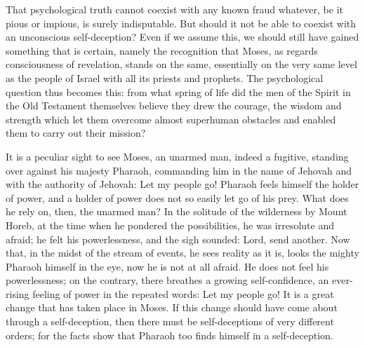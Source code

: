 \documentclass[12pt,a4paper,openany]{book}
\newcommand{\opage}[1]{\marginnote{\footnotesize\textit{[#1]}}}
\begin{document}
\setcounter{footnote}{0}%
\opage{25}That psychological truth cannot coexist
with any known fraud whatever, be it pious
or impious, is surely indisputable. But should it
not be able to coexist with an unconscious self-deception? Even
if we assume this, we should still have gained something that
is certain, namely the recognition that Moses, as regards consciousness of revelation,
stands on the same, essentially
on the very same level as the people of Israel with all its
priests and prophets. The psychological question
thus becomes this: from what spring of life did the men of the Spirit
in the Old Testament themselves believe they drew the
courage, the wisdom and strength which let them overcome
almost superhuman obstacles and enabled them
to carry out their mission?

It is a peculiar sight to see Moses, an unarmed
man, indeed a fugitive, standing over against his majesty
Pharaoh, commanding him in the name of Jehovah and with
the authority of Jehovah: Let my people go! Pharaoh feels
himself the holder of power, and a holder of power does not so
easily let go of his prey. What does he rely on, then, the unarmed
man? In the solitude of the wilderness by Mount Horeb, at the
time when he pondered the possibilities, he was irresolute
and afraid; he felt his powerlessness, and the sigh sounded:
Lord, send another. Now that, in the midst of the stream of events,
he sees reality as it is, looks the
mighty Pharaoh himself in the eye, now he is not at all
afraid. He does not feel his powerlessness; on the contrary, there breathes
a growing self-confidence, an ever-rising feeling of
power in the repeated words: Let my people go! It is
a great change that has taken place in Moses. If
this change should have come about through a self-deception, then
there must be self-deceptions of very different orders;
\setcounter{footnote}{0}%
\opage{26}for the facts show that Pharaoh too finds himself
in a self-deception.
\end{document}
